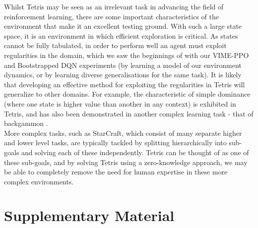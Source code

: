 \documentclass[12pt]{article}
\begin{document}
Whilst Tetris may be seen as an irrelevant task in advancing the field of reinforcement learning, there are some important characteristics of the environment that make it an excellent testing ground. With such a large state space, it is an environment in which efficient exploration is critical. As states cannot be fully tabulated, in order to perform well an agent must exploit regularities in the domain, which we saw the beginnings of with our VIME-PPO and Bootstrapped DQN experiments (by learning a model of our environment dynamics, or by learning diverse generalisations for the same task). It is likely that developing an effective method for exploiting the regularities in Tetris will generalize to other domains. For example, the characteristic of simple dominance (where one state is higher value than another in any context) is exhibited in Tetris, and has also been demonstrated in another complex learning task - that of backgammon \autocite{csimcsek2016most}.\\\newline
More complex tasks, such as StarCraft, which consist of many separate higher and lower level tasks, are typically tackled by splitting hierarchically into sub-goals and solving each of these independently. Tetris can be thought of as one of these sub-goals, and by solving Tetris using a zero-knowledge approach, we may be able to completely remove the need for human expertise in these more complex environments.  

\newrefcontext[sorting=nyt]
\printbibliography
\newpage
\section*{Supplementary Material}
\appendix
\end{document}
